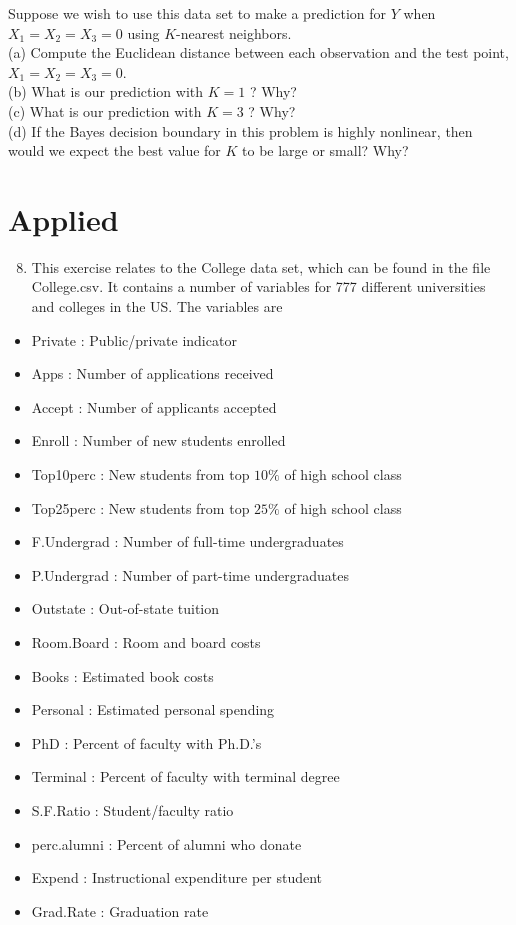 \documentclass[10pt]{article}
\begin{document}
Suppose we wish to use this data set to make a prediction for $Y$ when $X_{1}=X_{2}=X_{3}=0$ using $K$-nearest neighbors.\\
(a) Compute the Euclidean distance between each observation and the test point, $X_{1}=X_{2}=X_{3}=0$.\\
(b) What is our prediction with $K=1$ ? Why?\\
(c) What is our prediction with $K=3$ ? Why?\\
(d) If the Bayes decision boundary in this problem is highly nonlinear, then would we expect the best value for $K$ to be large or small? Why?

\section*{Applied}
\begin{enumerate}
  \setcounter{enumi}{7}
  \item This exercise relates to the College data set, which can be found in the file College.csv. It contains a number of variables for 777 different universities and colleges in the US. The variables are
\end{enumerate}

\begin{itemize}
  \item Private : Public/private indicator
  \item Apps : Number of applications received
  \item Accept : Number of applicants accepted
  \item Enroll : Number of new students enrolled
  \item Top10perc : New students from top $10 \%$ of high school class
  \item Top25perc : New students from top $25 \%$ of high school class
  \item F.Undergrad : Number of full-time undergraduates
  \item P.Undergrad : Number of part-time undergraduates
  \item Outstate : Out-of-state tuition
  \item Room.Board : Room and board costs
  \item Books : Estimated book costs
  \item Personal : Estimated personal spending
  \item PhD : Percent of faculty with Ph.D.'s
  \item Terminal : Percent of faculty with terminal degree
  \item S.F.Ratio : Student/faculty ratio
  \item perc.alumni : Percent of alumni who donate
  \item Expend : Instructional expenditure per student
  \item Grad.Rate : Graduation rate
\end{itemize}
\end{document}
